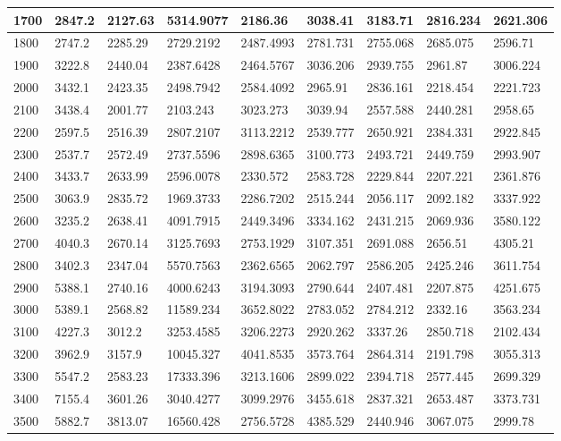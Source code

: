 \documentclass [11pt, proquest] {uwthesis}[2020/12/20]
\begin{document}
\begin{table}
\begin{tiny}
\begin{tabular}{|l|l|l|l|l|l|l|l|l|}
1700 & 2847.2 & 2127.63 & 5314.9077 & 2186.36 & 3038.41 & 3183.71 & 2816.234 & 2621.306 \\ \hline
1800 & 2747.2 & 2285.29 & 2729.2192 & 2487.4993 & 2781.731 & 2755.068 & 2685.075 & 2596.71 \\ \hline
1900 & 3222.8 & 2440.04 & 2387.6428 & 2464.5767 & 3036.206 & 2939.755 & 2961.87 & 3006.224 \\ \hline
2000 & 3432.1 & 2423.35 & 2498.7942 & 2584.4092 & 2965.91 & 2836.161 & 2218.454 & 2221.723 \\ \hline
2100 & 3438.4 & 2001.77 & 2103.243 & 3023.273 & 3039.94 & 2557.588 & 2440.281 & 2958.65 \\ \hline
2200 & 2597.5 & 2516.39 & 2807.2107 & 3113.2212 & 2539.777 & 2650.921 & 2384.331 & 2922.845 \\ \hline
2300 & 2537.7 & 2572.49 & 2737.5596 & 2898.6365 & 3100.773 & 2493.721 & 2449.759 & 2993.907 \\ \hline
2400 & 3433.7 & 2633.99 & 2596.0078 & 2330.572 & 2583.728 & 2229.844 & 2207.221 & 2361.876 \\ \hline
2500 & 3063.9 & 2835.72 & 1969.3733 & 2286.7202 & 2515.244 & 2056.117 & 2092.182 & 3337.922 \\ \hline
2600 & 3235.2 & 2638.41 & 4091.7915 & 2449.3496 & 3334.162 & 2431.215 & 2069.936 & 3580.122 \\ \hline
2700 & 4040.3 & 2670.14 & 3125.7693 & 2753.1929 & 3107.351 & 2691.088 & 2656.51 & 4305.21 \\ \hline
2800 & 3402.3 & 2347.04 & 5570.7563 & 2362.6565 & 2062.797 & 2586.205 & 2425.246 & 3611.754 \\ \hline
2900 & 5388.1 & 2740.16 & 4000.6243 & 3194.3093 & 2790.644 & 2407.481 & 2207.875 & 4251.675 \\ \hline
3000 & 5389.1 & 2568.82 & 11589.234 & 3652.8022 & 2783.052 & 2784.212 & 2332.16 & 3563.234 \\ \hline
3100 & 4227.3 & 3012.2 & 3253.4585 & 3206.2273 & 2920.262 & 3337.26 & 2850.718 & 2102.434 \\ \hline
3200 & 3962.9 & 3157.9 & 10045.327 & 4041.8535 & 3573.764 & 2864.314 & 2191.798 & 3055.313 \\ \hline
3300 & 5547.2 & 2583.23 & 17333.396 & 3213.1606 & 2899.022 & 2394.718 & 2577.445 & 2699.329 \\ \hline
3400 & 7155.4 & 3601.26 & 3040.4277 & 3099.2976 & 3455.618 & 2837.321 & 2653.487 & 3373.731 \\ \hline
3500 & 5882.7 & 3813.07 & 16560.428 & 2756.5728 & 4385.529 & 2440.946 & 3067.075 & 2999.78 \\ \hline

\end{tabular}
\end{tiny}
\end{table}
\end{document}
